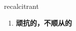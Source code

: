 
\begin{frame}
{\huge recalcitrant}
\begin{center}
\begin{enumerate}\Large
  \item \textbf{顽抗的，不顺从的}
\end{enumerate}
\end{center}
\end{frame}
